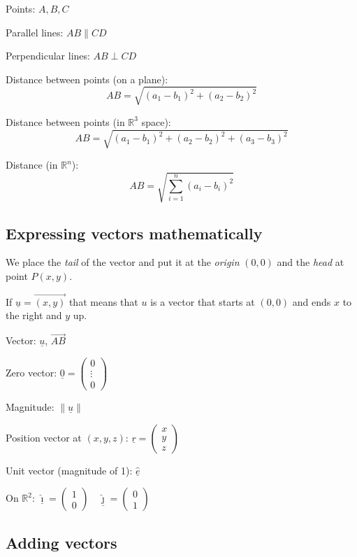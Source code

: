\documentclass[00_complete]{subfiles}
\begin{document}
Points: $A,B,C$

Parallel lines: $AB \parallel CD$

Perpendicular lines: $AB \perp CD$

Distance between points (on a plane):
$$AB = \sqrt{(a_1-b_1)^2+(a_2-b_2)^2}$$

Distance between points (in $\mathbb{R}^3$ space):
$$AB = \sqrt{(a_1-b_1)^2+(a_2-b_2)^2+(a_3-b_3)^2}$$

Distance (in $\mathbb{R}^n$):
$$AB= \sqrt{\displaystyle\sum_{i=1}^n(a_i-b_i)^2}$$

\subsection{Expressing vectors mathematically}

We place the \emph{tail} of the vector and put it at the \emph{origin} $(0,0)$ and the
\emph{head} at point $P(x,y)$.

If $\underline u = \vec{(x,y)}$ that means that $u$ is a vector that starts at $(0,0)$ and ends $x$ to the right and $y$ up.

\begin{symbols}
Vector: $\underline u$, $\vec{AB}$

Zero vector: $\underline 0 = \begin{pmatrix}
    0 \\
    \vdots \\
    0
\end{pmatrix}$

Magnitude: $\|\underline u\|$

Position vector at $(x,y,z)$: $\underline r =
\begin{pmatrix}
    x \\y\\z
\end{pmatrix}$

Unit vector (magnitude of 1): $\underline{\hat e}$

On $\mathbb{R}^2$: $\underline{\hat \imath} = \begin{pmatrix}
    1\\0
\end{pmatrix}
\quad
\underline{\hat \jmath} =  \begin{pmatrix}
    0\\1
\end{pmatrix}$

\end{symbols}
\subsection{Adding vectors}
\end{document}
